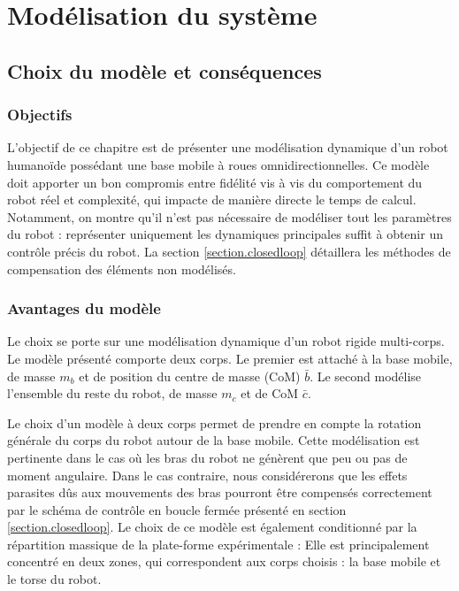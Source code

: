 \chapter{Modélisation du système}
\label{chapitre.modele}
\section{Choix du modèle et conséquences}
	\subsection{Objectifs}
		L'objectif de ce chapitre est de présenter une modélisation dynamique d'un robot humanoïde possédant une base mobile à roues omnidirectionnelles. 
		Ce modèle doit apporter un bon compromis entre fidélité vis à vis du comportement du robot réel et complexité, qui impacte de manière directe le temps de calcul.
		Notamment, on montre qu'il n'est pas nécessaire de modéliser tout les paramètres du robot : représenter uniquement les dynamiques principales suffit à obtenir un contrôle précis du robot. 
		La section \ref{section.closedloop} détaillera les méthodes de compensation des éléments non modélisés.
	
		
	\subsection{Avantages du modèle}
		
		Le choix se porte sur une modélisation dynamique d'un robot rigide multi-corps. 
		Le modèle présenté  comporte deux corps. Le premier est attaché à la base mobile, de masse $m_b$ et de position du centre de masse (CoM) $\bar{b}$.
		Le second modélise l'ensemble du reste du robot, de masse $m_c$ et de CoM $\bar{c}$.
		
		Le choix d'un modèle à deux corps permet de prendre en compte la rotation générale du corps du robot autour de la base mobile.
		Cette modélisation est pertinente dans le cas où les bras du robot ne génèrent que peu ou pas de moment angulaire.
		Dans le cas contraire, nous considérerons que les effets parasites dûs aux mouvements des bras pourront être compensés correctement par le schéma de contrôle en boucle fermée présenté en section \ref{section.closedloop}.
		Le choix de ce modèle est également conditionné par la répartition massique de la plate-forme expérimentale :
		Elle est principalement concentré en deux zones, qui correspondent aux corps choisis : la base mobile et le torse du robot.	
	
